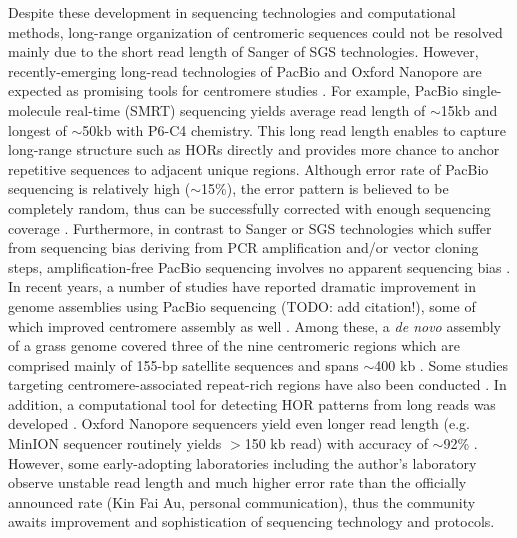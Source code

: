 Despite these development in sequencing technologies and computational methods, long-range organization of centromeric sequences could not be resolved mainly due to the short read length of Sanger of SGS technologies. However, recently-emerging long-read technologies of PacBio \cite{Eid2009} and Oxford Nanopore \cite{Jain2016} are expected as promising tools for centromere studies \cite{Aldrup-MacDonald2014, Miga2015}. For example, PacBio single-molecule real-time (SMRT) sequencing yields average read length of $\sim$15kb and longest of $\sim$50kb with P6-C4 chemistry. This long read length enables to capture long-range structure such as HORs directly and provides more chance to anchor repetitive sequences to adjacent unique regions. Although error rate of PacBio sequencing is relatively high ($\sim$15\%), the error pattern is believed to be completely random, thus can be successfully corrected with enough sequencing coverage \cite{Myers2014}. Furthermore, in contrast to Sanger or SGS technologies which suffer from sequencing bias deriving from PCR amplification and/or vector cloning steps, amplification-free PacBio sequencing involves no apparent sequencing bias \cite{Ross2013}. In recent years, a number of studies have reported dramatic improvement in genome assemblies using PacBio sequencing (TODO: add citation!), some of which improved centromere assembly as well \cite{VanBuren2015, Vij2016, Jiao2016}. Among these, a \textit{de novo} assembly of a grass genome covered three of the nine centromeric regions which are comprised mainly of 155-bp satellite sequences and spans $\sim$400 kb \cite{VanBuren2015}. Some studies targeting centromere-associated repeat-rich regions have also been conducted \cite{Wolfgruber2016, Khost2016}. In addition, a computational tool for detecting HOR patterns from long reads was developed \cite{Sevim2016}. Oxford Nanopore sequencers yield even longer read length (e.g. MinION sequencer routinely yields $>$150 kb read) with accuracy of $\sim$92\% \cite{Jain2016}. However, some early-adopting laboratories including the author's laboratory observe unstable read length and much higher error rate than the officially announced rate (Kin Fai Au, personal communication), thus the community awaits improvement and sophistication of sequencing technology and protocols.

